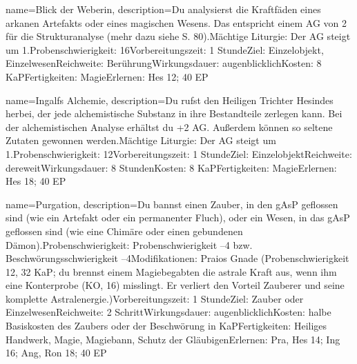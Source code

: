 {
    name={Blick der Weberin},
    description={Du analysierst die Kraftfäden eines arkanen Artefakts oder eines magischen Wesens. Das entspricht einem AG von 2 für die Strukturanalyse (mehr dazu siehe S. 80).\newline Mächtige Liturgie: Der AG steigt um 1.\newline Probenschwierigkeit: 16\newline Vorbereitungszeit: 1 Stunde\newline Ziel: Einzelobjekt, Einzelwesen\newline Reichweite: Berührung\newline Wirkungsdauer: augenblicklich\newline Kosten: 8 KaP\newline Fertigkeiten: Magie\newline Erlernen: Hes 12; 40 EP}
}


{
    name={Ingalfs Alchemie},
    description={Du rufst den Heiligen Trichter Hesindes herbei, der jede alchemistische Substanz in ihre Bestandteile zerlegen kann. Bei der alchemistischen Analyse erhältst du +2 AG. Außerdem können so seltene Zutaten gewonnen werden.\newline Mächtige Liturgie: Der AG steigt um 1.\newline Probenschwierigkeit: 12\newline Vorbereitungszeit: 1 Stunde\newline Ziel: Einzelobjekt\newline Reichweite: dereweit\newline Wirkungsdauer: 8 Stunden\newline Kosten: 8 KaP\newline Fertigkeiten: Magie\newline Erlernen: Hes 18; 40 EP}
}


{
    name={Purgation},
    description={Du bannst einen Zauber, in den gAsP geflossen sind (wie ein Artefakt oder ein permanenter Fluch), oder ein Wesen, in das gAsP geflossen sind (wie eine Chimäre oder einen gebundenen Dämon).\newline Probenschwierigkeit: Probenschwierigkeit –4 bzw. Beschwörungsschwierigkeit –4\newline Modifikationen: Praios Gnade (Probenschwierigkeit 12, 32 KaP; du brennst einem Magiebegabten die astrale Kraft aus, wenn ihm eine Konterprobe (KO, 16) misslingt. Er verliert den Vorteil Zauberer und seine komplette Astralenergie.)\newline Vorbereitungszeit: 1 Stunde\newline Ziel: Zauber oder Einzelwesen\newline Reichweite: 2 Schritt\newline Wirkungsdauer: augenblicklich\newline Kosten: halbe Basiskosten des Zaubers oder der Beschwörung in KaP\newline Fertigkeiten: Heiliges Handwerk, Magie, Magiebann, Schutz der Gläubigen\newline Erlernen: Pra, Hes 14; Ing 16; Ang, Ron 18; 40 EP}
}


